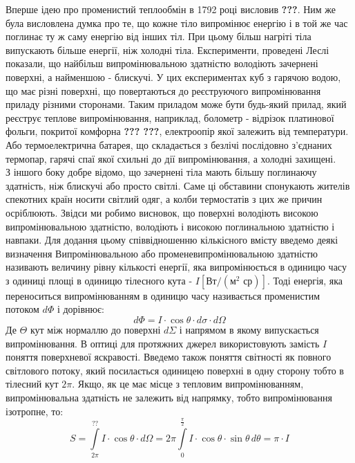 \documentclass{article}
\begin{document}
\Task{} Вперше ідею про променистий теплообмін в 1792 році висловив \textbf{???}. Ним же була висловлена думка про те, що кожне тіло випромінює енергію і в 
той же час поглинає ту ж саму енергію від інших тіл. При цьому більш нагріті тіла випускають більше енергії, ніж холодні тіла. Експерименти, проведені Леслі 
показали, що найбільш випромінювальною здатністю володіють зачернені поверхні, а найменшою - блискучі. У цих експериментах куб з гарячою водою, що має різні 
поверхні, що повертаються до реєструючого випромінювання приладу різними сторонами. Таким приладом може бути будь-який прилад, який реєструє теплове випромінювання, 
наприклад, болометр - відрізок платинової фольги, покритої комфорна \textbf{??? ???}, електроопір якої залежить від температури. Або термоелектрична батарея, 
що складається з безлічі послідовно з'єднаних термопар, гарячі спаї якої схильні до дії випромінювання, а холодні захищені. \vspace{5mm} \\
З іншого боку добре відомо, що зачернені тіла мають більшу поглинаючу здатність, ніж блискучі або просто світлі. Саме ці обставини спонукають жителів спекотних 
країн носити світлий одяг, а колби термостатів з цих же причин осріблюють. Звідси ми робимо висновок, що поверхні володіють високою випромінювальною здатністю, 
володіють і високою поглинальною здатністю і навпаки. Для додання цьому співвідношенню кількісного вмісту введемо деякі визначення Випромінювальною або 
променевипромінювальною здатністю називають величину рівну кількості енергії, яка випромінюється в одиницю часу з одиниці площі в одиницю тілесного кута - 
$I \left[\text{Вт}/(\text{м$^{2}$ ср})\right]$. Тоді енергія, яка переноситься випромінюванням в одиницю часу називається променистим потоком $d\Phi$ і дорівнює: 
\begin{equation}
    \label{eq:RadiantStream}
    d\Phi = I \cdot \cos{\theta} \cdot d\sigma \cdot d\Omega
\end{equation}
Де $\Theta$ кут між нормаллю до поверхні $d\Sigma$ і напрямом в якому випускається випромінювання. В оптиці для протяжних джерел використовують замість $I$ поняття 
поверхневої яскравості. Введемо також поняття світності як повного світлового потоку, який посилається одиницею поверхні в одну сторону тобто в тілесний кут $2\pi$. 
Якщо, як це має місце з тепловим випромінюванням, випромінювальна здатність не залежить від напрямку, тобто випромінювання ізотропне, то: 
\begin{equation}
\label{eq:IsotropicRadiation}
S = \int\limits_{2\pi}^{\textbf{??}} I \cdot \cos{\theta} \cdot d\Omega = 2\pi \int\limits_{0}^{\tfrac{\pi}{2}} I \cdot \cos{\theta} \cdot \sin{\theta} \, d\theta = \pi \cdot I
\end{equation}
\end{document}
